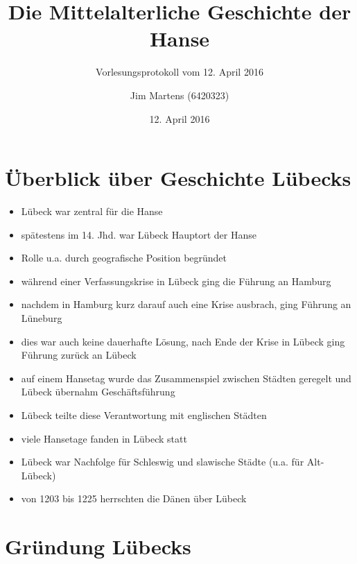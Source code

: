 \documentclass[10pt,a4paper,oneside,ngerman,numbers=noenddot]{scrartcl}
\newenvironment{myitemize}{\begin{itemize}\itemsep -8pt}{\end{itemize}} %
\begin{document}
\author{Jim Martens (6420323)}
\title{Die Mittelalterliche Geschichte der Hanse}
\subtitle{Vorlesungsprotokoll vom 12. April 2016}
\date{12. April 2016}
\maketitle

\section*{Überblick über Geschichte Lübecks}

\begin{myitemize}
    \item Lübeck war zentral für die Hanse
    \item spätestens im 14. Jhd. war Lübeck Hauptort der Hanse
    \item Rolle u.a. durch geografische Position begründet
    \item während einer Verfassungskrise in Lübeck ging die Führung an Hamburg
    \item nachdem in Hamburg kurz darauf auch eine Krise ausbrach, ging Führung an Lüneburg
    \item dies war auch keine dauerhafte Lösung, nach Ende der Krise in Lübeck ging Führung zurück an Lübeck
    \item auf einem Hansetag wurde das Zusammenspiel zwischen Städten geregelt und Lübeck übernahm Geschäftsführung
    \item Lübeck teilte diese Verantwortung mit englischen Städten
    \item viele Hansetage fanden in Lübeck statt
    \item Lübeck war Nachfolge für Schleswig und slawische Städte (u.a. für Alt-Lübeck)
    \item von 1203 bis 1225 herrschten die Dänen über Lübeck
\end{myitemize}

\section*{Gründung Lübecks}
\end{document}
